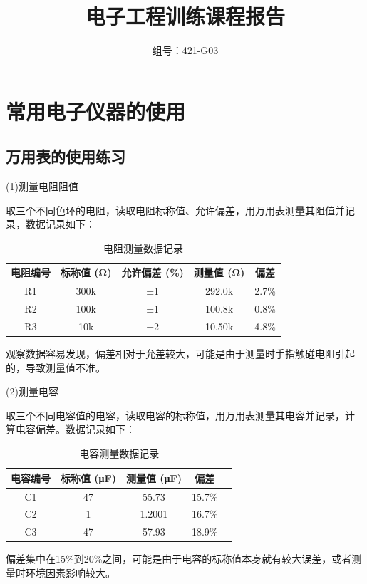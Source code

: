 \documentclass[12pt,a4paper]{article}
\title{\textbf{电子工程训练课程报告}}
\author{
    \begin{tabular}{ll}
        组号：421-G03
    \end{tabular}
}
\date{}
\begin{document}
\maketitle
\thispagestyle{empty}

\newpage
\setcounter{page}{1}


\section{常用电子仪器的使用}
\subsection{万用表的使用练习}
(1)测量电阻阻值

取三个不同色环的电阻，读取电阻标称值、允许偏差，用万用表测量其阻值并记
录，数据记录如下：
\begin{table}[H]
    \centering
    \begin{tabular}{|c|c|c|c|c|}
        \hline
        电阻编号 & 标称值 (Ω) & 允许偏差 (\%) & 测量值 (Ω) & 偏差 \\ \hline
        R1      & 300k       & ±1            & 292.0k         & 2.7\% \\ \hline
        R2      & 100k       & ±1            & 100.8k        & 0.8\% \\ \hline
        R3      & 10k       & ±2            & 10.50k        & 4.8\% \\ \hline
    \end{tabular}
    \caption{电阻测量数据记录}
    \label{tab:resistance}
\end{table}
观察数据容易发现，偏差相对于允差较大，可能是由于测量时手指触碰电阻引起的，导致测量值不准。

(2)测量电容

取三个不同电容值的电容，读取电容的标称值，用万用表测量其电容并记录，计
算电容偏差。数据记录如下：
\begin{table}[H]
    \centering
    \begin{tabular}{|c|c|c|c|c|}
        \hline
        电容编号 & 标称值 (μF) & 测量值 (μF) & 偏差 \\ \hline
        C1      & 47          & 55.73         & 15.7\% \\ \hline
        C2      & 1           & 1.2001        & 16.7\% \\ \hline
        C3      & 47         & 57.93       & 18.9\% \\ \hline
    \end{tabular}
    \caption{电容测量数据记录}
    \label{tab:capacitance}
\end{table}
偏差集中在15\%到20\%之间，可能是由于电容的标称值本身就有较大误差，或者测量时环境因素影响较大。
\end{document}
